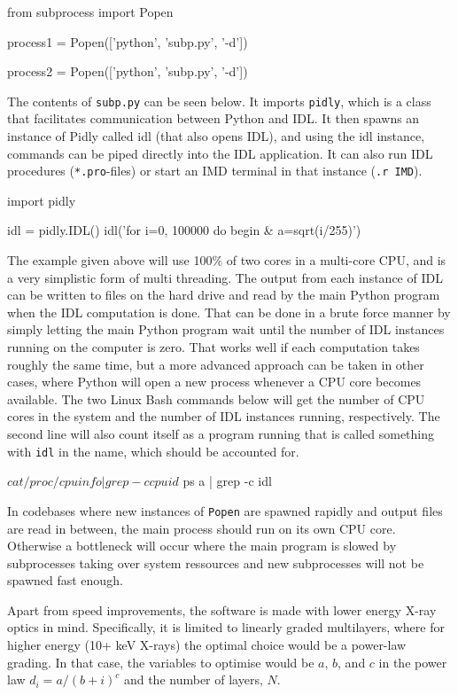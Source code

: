 \begin{verbcode}
from subprocess import Popen

process1 = Popen(['python', 'subp.py', '-d'])

process2 = Popen(['python', 'subp.py', '-d'])
\end{verbcode}

The contents of \verb|subp.py| can be seen below. It imports \verb|pidly|, which is a class that facilitates communication between Python and IDL. It then spawns an instance of Pidly called idl (that also opens IDL), and using the idl instance, commands can be piped directly into the IDL application. It can also run IDL procedures (\verb|*.pro|-files) or start an IMD terminal in that instance (\verb|.r IMD|).

\begin{verbcode}
import pidly

idl = pidly.IDL()
idl('for i=0, 100000 do begin & a=sqrt(i/255)')
\end{verbcode}

The example given above will use 100\% of two cores in a multi-core CPU, and is a very simplistic form of multi threading. The output from each instance of IDL can be written to files on the hard drive and read by the main Python program when the IDL computation is done. That can be done in a brute force manner by simply letting the main Python program wait until the number of IDL instances running on the computer is zero. That works well if each computation takes roughly the same time, but a more advanced approach can be taken in other cases, where Python will open a new process whenever a CPU core becomes available. The two Linux Bash commands below will get the number of CPU cores in the system and the number of IDL instances running, respectively. The second line will also count itself as a program running that is called something with \verb|idl| in the name, which should be accounted for.

\begin{verbcode}
  $ cat /proc/cpuinfo | grep -c cpuid

  $ ps a | grep -c idl
\end{verbcode}

In codebases where new instances of \verb|Popen| are spawned rapidly and output files are read in between, the main process should run on its own CPU core. Otherwise a bottleneck will occur where the main program is slowed by subprocesses taking over system ressources and new subprocesses will not be spawned fast enough.

Apart from speed improvements, the software is made with lower energy X-ray optics in mind. Specifically, it is limited to linearly graded multilayers, where for higher energy (10+ keV X-rays) the optimal choice would be a power-law grading. In that case, the variables to optimise would be $a$, $b$, and $c$ in the power law $d_i = a/(b+i)^c$ and the number of layers, $N$.
